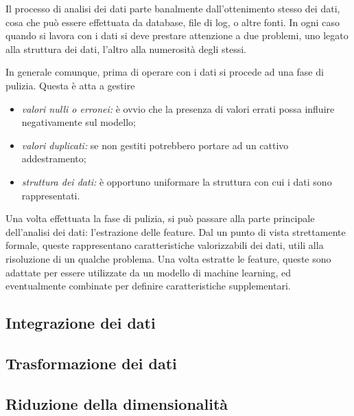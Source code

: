 \documentclass{subfiles}
\begin{document}
Il processo di analisi dei dati parte banalmente dall'ottenimento stesso dei dati,
cosa che può essere effettuata da database, file di log, o altre fonti.
In ogni caso quando si lavora con i dati si deve prestare attenzione a due problemi,
uno legato alla struttura dei dati, l'altro alla numerosità degli stessi.

In generale comunque, prima di operare con i dati si procede ad una fase di pulizia.
Questa è atta a gestire
\begin{itemize}
    \item \emph{valori nulli o erronei:} è ovvio che la presenza di valori errati possa influire negativamente sul modello;
    \item \emph{valori duplicati:} se non gestiti potrebbero portare ad un cattivo addestramento;
    \item \emph{struttura dei dati:} è opportuno uniformare la struttura con cui i dati sono rappresentati.
\end{itemize}

Una volta effettuata la fase di pulizia, si può passare alla parte principale dell'analisi dei dati: l'estrazione delle feature.
Dal un punto di vista strettamente formale, queste rappresentano caratteristiche valorizzabili dei dati,
utili alla risoluzione di un qualche problema. Una volta estratte le feature, queste sono adattate per essere utilizzate da un modello di machine learning,
ed eventualmente combinate per definire caratteristiche supplementari.

\subsection{Integrazione dei dati}


\subsection{Trasformazione dei dati}


\subsection{Riduzione della dimensionalità}

\clearpage
\end{document}

